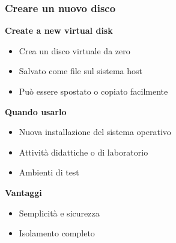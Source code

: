 \documentclass{beamer}
\begin{document}
	\begin{frame}
		\frametitle{Creare un nuovo disco}
		
		\textbf{Create a new virtual disk}
		
		\begin{itemize}
			\item Crea un disco virtuale da zero
			\item Salvato come file sul sistema host
			\item Può essere spostato o copiato facilmente
		\end{itemize}
		
		\vspace{0.5cm}
		
		\textbf{Quando usarlo}
		\begin{itemize}
			\item Nuova installazione del sistema operativo
			\item Attività didattiche o di laboratorio
			\item Ambienti di test
		\end{itemize}
		
		\vspace{0.5cm}
		
		\textbf{Vantaggi}
		\begin{itemize}
			\item Semplicità e sicurezza
			\item Isolamento completo
		\end{itemize}
		
	\end{frame}
	
	
\end{document}
